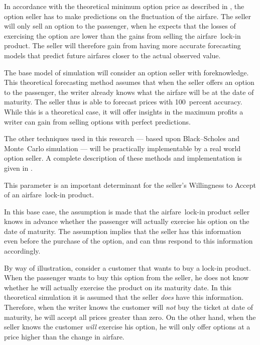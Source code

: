 In accordance with the theoretical minimum option price as described in , the option seller has to make predictions on the fluctuation of the airfare. The seller will only sell an option to the passenger, when he expects that the losses of exercising the option are lower than the gains from selling the airfare~lock-in product. The seller will therefore gain from having more accurate forecasting models that predict future airfares closer to the actual observed value.

The base model of simulation will consider an option seller with foreknowledge. This theoretical forecasting method assumes that when the seller offers an option to the passenger, the writer already knows what the airfare will be at the date of maturity. The seller thus is able to forecast prices with 100~percent accuracy. While this is a theoretical case, it will offer insights in the maximum profits a writer can gain from selling options with perfect predictions.

The other techniques used in this research --- based upon Black--Scholes and Monte~Carlo simulation --- will be practically implementable by a real world option seller. A complete description of these methods and implementation is given in .

This parameter is an important determinant for the seller's Willingness to Accept of an airfare~lock-in product.

In this base case, the assumption is made that the airfare~lock-in product seller knows in advance whether the passenger will actually exercise his option on the date of maturity. The assumption implies that the seller has this information even before the purchase of the option, and can thus respond to this information accordingly.

By way of illustration, consider a customer that wants to buy a lock-in product. When the passenger wants to buy this option from the seller, he does not know whether he will actually exercise the product on its maturity date. In this theoretical simulation it is assumed that the seller \emph{does} have this information. Therefore, when the writer knows the customer will \emph{not} buy the ticket at date of maturity, he will accept all prices greater than zero. On the other hand, when the seller knows the customer \emph{will} exercise his option, he will only offer options at a price higher than the change in airfare.

